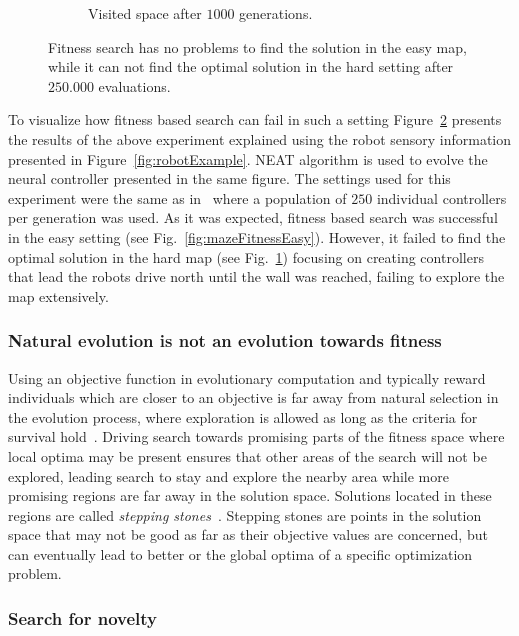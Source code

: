 \begin{figure}[t!]
\begin{subfigure}[b]{0.3\textwidth}
\caption{Visited space after $1000$ generations.}
\label{fig:mazeFitnessHard}
\end{subfigure}
\caption{Fitness search has no problems to find the solution in the easy map, while it can not find the optimal solution in the hard setting after $250.000$ evaluations.}
\label{fig:mazeFitness}
\end{figure}


To visualize how fitness based search can fail in such a setting Figure~\ref{fig:mazeFitness} presents the results of the above experiment explained using the robot sensory information presented in Figure~\ref{fig:robotExample}. NEAT algorithm is used to evolve the neural controller presented in the same figure. The settings used for this experiment were the same as in~\citep{lehman2011abandoning} where a population of $250$ individual controllers per generation was used. As it was expected, fitness based search was successful in the easy setting (see Fig.~\ref{fig:mazeFitnessEasy}). However, it failed to find the optimal solution in the hard map (see Fig.~\ref{fig:mazeFitnessHard}) focusing on creating controllers that lead the robots drive north until the wall was reached, failing to explore the map extensively.

\subsubsection*{Natural evolution is not an evolution towards fitness}

Using an objective function in evolutionary computation and typically reward individuals which are closer to an objective is far away from natural selection in the evolution process, where exploration is allowed as long as the criteria for survival hold~\citep{lehman2010revising}. Driving search towards promising parts of the fitness space where local optima may be present ensures that other areas of the search will not be explored, leading search to stay and explore the nearby area while more promising regions are far away in the solution space. Solutions located in these regions are called \emph{stepping stones}~\citep{lehman2008exploiting,lehman2011abandoning,lehman2010revising,risi2009novelty}. Stepping stones are points in the solution space that may not be good as far as their objective values are concerned, but can eventually lead to better or the global optima of a specific optimization problem.


\subsubsection*{Search for novelty}

